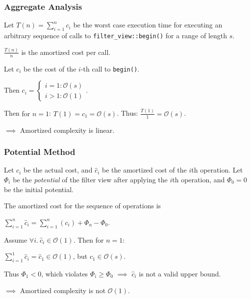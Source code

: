 \documentclass[aspectratio=169]{beamer}
\begin{document}
\fi %

\begin{frame}
  \frametitle{Aggregate Analysis}
  
  Let $T(n) = \sum_{i = 1}^n c_i$ be the worst case execution time for executing an arbitrary sequence of calls to \texttt{filter\_view::begin()} for a range of length $s$.
  
  $\frac{T(n)}{n}$ is the amortized cost per call.
  
  Let $c_i$ be the cost of the $i$-th call to \texttt{begin()}.
  
  Then $c_i = \left\{\begin{matrix} i=1: \mathcal{O}(s) \\ i > 1: \mathcal{O}(1) \end{matrix}\right.$.
  
  Then \alert{for $n=1$}: $T(1) = c_1 = \mathcal{O}(s)$. Thus: $\frac{T(1)}{1} = \mathcal{O}(s)$.
  
  \vspace{10pt}
  
  $\implies$ \alert{Amortized complexity is linear}.
  
\end{frame}

\begin{frame}
  \frametitle{Potential Method}
  
  Let $c_i$ be the actual cost, and $\hat{c}_i$ be the amortized cost of the $i$th operation. Let $\Phi_i$ be the \textit{potential} of the filter view after applying the $i$th operation, and $\Phi_0 = 0$ be the initial potential.
  
  The amortized cost for the sequence of operations is

  $\sum_{i=1}^{n}\hat{c}_i = \sum_{i=1}^n( c_i ) + \Phi_n - \Phi_0$.
  
  \vspace{12pt}
  
  Assume $\forall i.\ \hat{c}_i \in \mathcal{O}(1)$. Then \alert{for $n = 1$}:
  
  $\sum_{i=1}^{1}\hat{c}_i = \hat{c}_1 \in \mathcal{O}(1)$, but $c_1 \in \mathcal{O}(s)$.
  
  Thus $\Phi_1 < 0$, which violates $\Phi_i \geq \Phi_0$ $\implies$ $\hat{c}_i$ is not a valid upper bound.
  
  \vspace{12pt}
  
  $\implies$ \alert{Amortized complexity is not $\mathcal{O}(1)$}.
  
\end{frame}
\end{document}

